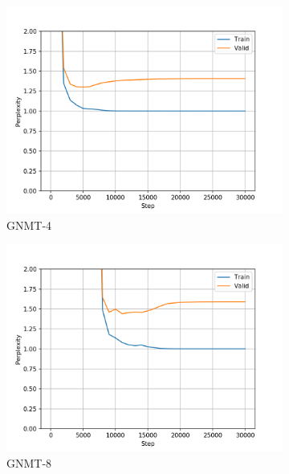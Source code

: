 \begin{figure}[h]
\begin{subfigure}{0.3\textwidth}
\includegraphics[width=\textwidth]{../results/monument2_2/run1/wmt16_gnmt_4_layer/ppls.png} 
\caption{GNMT-4}
\label{fig:monu2 gnmt4 ppl}
\end{subfigure}
\hfill
\begin{subfigure}{0.3\textwidth}
\includegraphics[width=\textwidth]{../results/monument2_2/run1/wmt16_gnmt_8_layer/ppls.png}
\caption{GNMT-8}
\label{fig:monu2 gnmt8 ppl}
\end{subfigure}
\hfill
\begin{subfigure}{0.3\textwidth}

\end{subfigure}
\end{figure}
